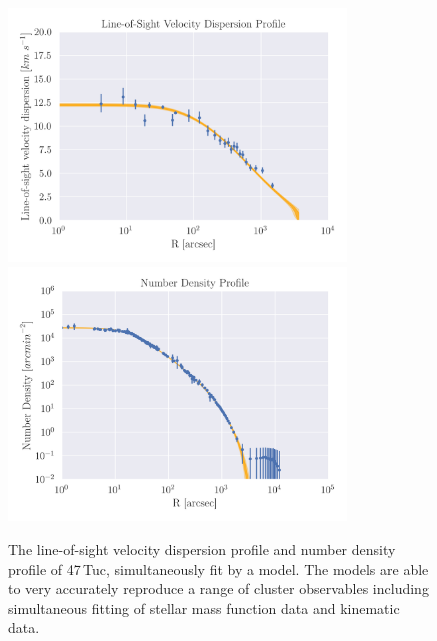 \begin{figure}
	\centering
	\includegraphics[width=0.8\textwidth]{./figures/limepy_veldisp.png}
	\includegraphics[width=0.8\textwidth]{./figures/limepy_numdens.png}
	\caption{The line-of-sight velocity dispersion profile and number density profile of
		47\,Tuc, simultaneously fit by a  model. The  models are
		able to very accurately reproduce a range of cluster observables including
		simultaneous fitting of stellar mass function data and kinematic data.}
	\label{fig:1/limepy_models}
\end{figure}


